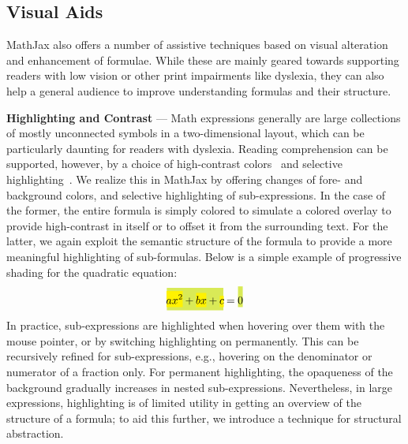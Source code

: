 \documentclass{sig-alternate}
\begin{document}
\def\myparagraph#1{\vspace{1ex}\noindent\textbf{#1} ---}

\subsection{Visual Aids}

MathJax also offers a number of assistive techniques based on visual alteration
and enhancement of formulae. While these are mainly geared towards supporting
readers with low vision or other print impairments like dyslexia, they can also
help a general audience to improve understanding formulas and their structure.

\myparagraph{Highlighting and Contrast} Math expressions generally are large
collections of mostly unconnected symbols in a two-dimensional layout, which can
be particularly daunting for readers with dyslexia.  Reading comprehension can
be supported, however, by a choice of high-contrast
colors~\cite{rello2012optimal} and selective
highlighting~\cite{jones2008strategies}. We realize this in MathJax by offering
changes of fore- and background colors, and selective highlighting of
sub-expressions. In the case of the former, the entire
formula is simply colored to simulate a colored overlay to provide high-contrast
in itself or to offset it from the surrounding text.  For the latter, we again
exploit the semantic structure of the formula to provide a more meaningful
highlighting of sub-formulas. Below is a simple example of progressive shading
for the quadratic equation:
\def\cb#1{\colorbox{yellow}{\ensuremath{\!\!\displaystyle#1\!\!}}}
\def\cc#1{\colorbox{GreenYellow}{\ensuremath{\!\!\displaystyle#1\!\!}}}
\[\cc{\cb{ax^2} + \cb{bx} + \cb{c}} = \cc{\rule[3ex]{0pt}{0pt}0}\]
In practice, sub-expressions are highlighted when hovering over them with the
mouse pointer, or by switching highlighting on permanently. This can be
recursively refined for sub-expressions, e.g., hovering on the denominator or
numerator of a fraction only. For permanent highlighting, the opaqueness of the
background gradually increases in nested sub-expressions. Nevertheless, in large
expressions, highlighting is of limited utility in getting an overview of the structure
of a formula; to aid this further, we introduce a technique for
structural abstraction.
\end{document}
